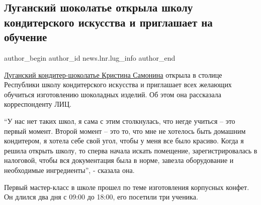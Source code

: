  
 
 
 
 
 
\subsection{Луганский шоколатье открыла школу кондитерского искусства и приглашает на обучение}
\label{sec:27_01_2022.stz.news.lnr.lug_info.2.shokolatje_lugansk}
 
\ifcmt
 author_begin
   author_id news.lnr.lug_info
 author_end
\fi

\href{https://lug-info.com/comments/luganskij-konditer-shokolat-e-kristina-samonina-shokolad-neset-neveroyatnoe-umirotvorenie-pri-rabote-s-nim}{Луганский кондитер-шоколатье Кристина Самонина} открыла в столице Республики
школу кондитерского искусства и приглашает всех желающих обучиться изготовлению
шоколадных изделий. Об этом она рассказала корреспонденту ЛИЦ.


\enquote{У нас нет таких школ, я сама с этим столкнулась, что негде учиться – это
первый момент. Второй момент – это то, что мне не хотелось быть домашним
кондитером, я хотела себе свой угол, чтобы у меня все было красиво. Когда я
решила открыть школу, то сперва начала искать помещение, зарегистрировалась в
налоговой, чтобы вся документация была в норме, завезла оборудование и
необходимые ингредиенты}, - сказала она.


Первый мастер-класс в школе прошел по теме изготовления корпусных конфет. Он
длился два дня с 09:00 до 18:00, его посетили три ученика.


